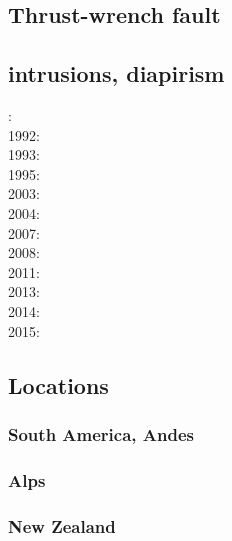 \subsection*{Thrust-wrench fault} 

\cite{rods15}

\subsection*{intrusions, diapirism}

: \cite{brpo81}\\
1992: \cite{vayv92}\cite{zaju92}\cite{wein92}\cite{wesc92}\\
1993: \cite{kesb93}\cite{nabr93}\cite{potp93}\cite{povp93}\cite{vasv93}\cite{poli93}\cite{popt93}\cite{wein93}\\
1995: \cite{wepo95}\cite{bisc95}\cite{wein95}\\
2003: \cite{geur03}\cite{vavs03}\\
2004: \cite{gepm04}\cite{istt04}\cite{geur04}\\
2007: \cite{gebu07}\\
2008: \cite{buge08}\cite{zlfd08}\\
2011: \cite{ellw11}\\
2013: \cite{fusc13}\\
2014: \cite{feka14b}\\
2015: \cite{feka15}\cite{fuks15}


\subsection*{Locations}


\subsubsection*{South America, Andes} 

\cite{wdbo94b}
\cite{basv06}
\cite{robn16}

\subsubsection*{Alps} 

\cite{buge05}

\subsubsection*{New Zealand} 

